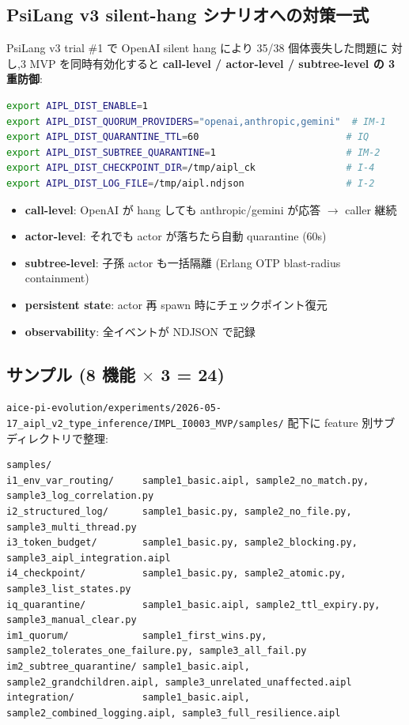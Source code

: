\documentclass[11pt,a4paper]{article}
\begin{document}
\subsection{PsiLang v3 silent-hang シナリオへの対策一式}

PsiLang v3 trial \#1 で OpenAI silent hang により 35/38 個体喪失した問題に
対し,3 MVP を同時有効化すると \textbf{call-level / actor-level /
subtree-level の 3 重防御}:

\begin{lstlisting}[language=bash]
export AIPL_DIST_ENABLE=1
export AIPL_DIST_QUORUM_PROVIDERS="openai,anthropic,gemini"  # IM-1
export AIPL_DIST_QUARANTINE_TTL=60                          # IQ
export AIPL_DIST_SUBTREE_QUARANTINE=1                       # IM-2
export AIPL_DIST_CHECKPOINT_DIR=/tmp/aipl_ck                # I-4
export AIPL_DIST_LOG_FILE=/tmp/aipl.ndjson                  # I-2
\end{lstlisting}

\begin{itemize}\setlength{\itemsep}{0pt}
\item \textbf{call-level}: OpenAI が hang しても anthropic/gemini が応答 $\to$ caller 継続
\item \textbf{actor-level}: それでも actor が落ちたら自動 quarantine (60s)
\item \textbf{subtree-level}: 子孫 actor も一括隔離 (Erlang OTP blast-radius containment)
\item \textbf{persistent state}: actor 再 spawn 時にチェックポイント復元
\item \textbf{observability}: 全イベントが NDJSON で記録
\end{itemize}

\subsection{サンプル (8 機能 $\times$ 3 = 24)}

\texttt{aice-pi-evolution/experiments/2026-05-17\_aipl\_v2\_type\_inference/IMPL\_I0003\_MVP/samples/}
配下に feature 別サブディレクトリで整理:

\begin{lstlisting}
samples/
i1_env_var_routing/     sample1_basic.aipl, sample2_no_match.py, sample3_log_correlation.py
i2_structured_log/      sample1_basic.py, sample2_no_file.py, sample3_multi_thread.py
i3_token_budget/        sample1_basic.py, sample2_blocking.py, sample3_aipl_integration.aipl
i4_checkpoint/          sample1_basic.py, sample2_atomic.py, sample3_list_states.py
iq_quarantine/          sample1_basic.aipl, sample2_ttl_expiry.py, sample3_manual_clear.py
im1_quorum/             sample1_first_wins.py, sample2_tolerates_one_failure.py, sample3_all_fail.py
im2_subtree_quarantine/ sample1_basic.aipl, sample2_grandchildren.aipl, sample3_unrelated_unaffected.aipl
integration/            sample1_basic.aipl, sample2_combined_logging.aipl, sample3_full_resilience.aipl
\end{lstlisting}
\end{document}
